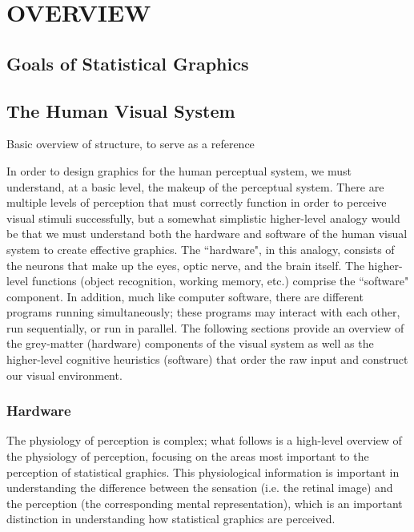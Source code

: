 \documentclass[11pt]{isuthesis}
\begin{document}
\graphicspath{{Figure/LitReview/}{Images/LitReview/}}
\renewcommand{\floatpagefraction}{.99}





\chapter{OVERVIEW}

\section{Goals of Statistical Graphics}

\section{The Human Visual System}
Basic overview of structure, to serve as a reference

In order to design graphics for the human perceptual system, we must understand, at a basic level, the makeup of the perceptual system. There are multiple levels of perception that must correctly function in order to perceive visual stimuli successfully, but a somewhat simplistic higher-level analogy would be that we must understand both the hardware and software of the human visual system to create effective graphics.
The ``hardware", in this analogy, consists of the neurons that make up the eyes, optic nerve, and the brain itself. The higher-level functions (object recognition, working memory, etc.) comprise the ``software" component. In addition, much like computer software, there are different programs running simultaneously; these programs may interact with each other, run sequentially, or run in parallel. The following sections provide an overview of the grey-matter (hardware) components of the visual system as well as the higher-level cognitive heuristics (software) that order the raw input and construct our visual environment. 

\subsection{Hardware}
The physiology of perception is complex; what follows is a high-level overview of the physiology of perception, focusing on the areas most important to the perception of statistical graphics. This physiological information is important in understanding the difference between the sensation (i.e. the retinal image) and the perception (the corresponding mental representation), which is an important distinction in understanding how statistical graphics are perceived. 
\end{document}
